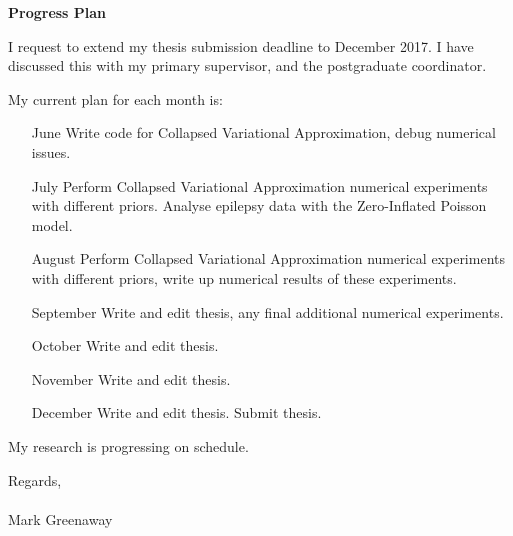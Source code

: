 \documentclass{letter}
\begin{document}
\bigskip
\textbf{Progress Plan}

\bigskip\noindent
I request to extend my thesis submission deadline to December 2017. I have discussed this with my
primary supervisor, and the postgraduate coordinator.

My current plan for each month is:
\begin{itemize}
\item[June] Write code for Collapsed Variational Approximation, debug
numerical issues.
\item[July] Perform Collapsed Variational Approximation numerical experiments
with different priors. Analyse
epilepsy data with the Zero-Inflated Poisson model.
\item[August] Perform Collapsed Variational Approximation numerical
experiments with different priors, write up
numerical results of these experiments.
\item[September] Write and edit thesis, any final additional numerical
experiments.
\item[October] Write and edit thesis.
\item[November] Write and edit thesis.
\item[December] Write and edit thesis. Submit thesis.
\end{itemize}

My research is progressing on schedule.

Regards, \\
\\
Mark Greenaway
\end{document}

